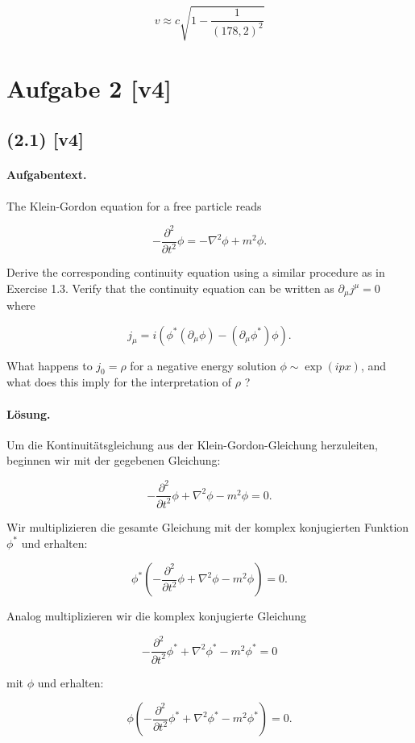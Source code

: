 \documentclass[11pt,a4paper]{article}
\begin{document}
\[
v \approx c \sqrt{1 - \frac{1}{(178{,}2)^2}}
\]


\section*{Aufgabe 2 [v4]}
\subsection*{(2.1) [v4]}
\paragraph{Aufgabentext.}
The Klein-Gordon equation for a free particle reads

$$
-\frac{\partial^2}{\partial t^2} \phi=-\nabla^2 \phi+m^2 \phi .
$$


Derive the corresponding continuity equation using a similar procedure as in Exercise 1.3.
Verify that the continuity equation can be written as $\partial_\mu j^\mu=0$ where

$$
j_\mu=i\left(\phi^*\left(\partial_\mu \phi\right)-\left(\partial_\mu \phi^*\right) \phi\right) .
$$


What happens to $j_0=\rho$ for a negative energy solution $\phi \sim \exp (i p x)$, and what does this imply for the interpretation of $\rho$ ?

\paragraph{Lösung.}
Um die Kontinuitätsgleichung aus der Klein-Gordon-Gleichung herzuleiten, beginnen wir mit der gegebenen Gleichung:

\[
-\frac{\partial^2}{\partial t^2} \phi + \nabla^2 \phi - m^2 \phi = 0.
\]

Wir multiplizieren die gesamte Gleichung mit der komplex konjugierten Funktion \(\phi^*\) und erhalten:

\[
\phi^* \left(-\frac{\partial^2}{\partial t^2} \phi + \nabla^2 \phi - m^2 \phi \right) = 0.
\]

Analog multiplizieren wir die komplex konjugierte Gleichung

\[
-\frac{\partial^2}{\partial t^2} \phi^* + \nabla^2 \phi^* - m^2 \phi^* = 0
\]

mit \(\phi\) und erhalten:

\[
\phi \left(-\frac{\partial^2}{\partial t^2} \phi^* + \nabla^2 \phi^* - m^2 \phi^* \right) = 0.
\]
\end{document}
